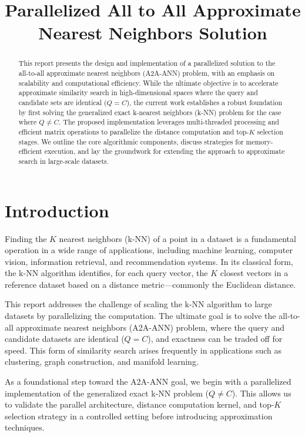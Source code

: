 \documentclass[conference]{IEEEtran}
\title{Parallelized All to All Approximate Nearest Neighbors Solution}
\author{\IEEEauthorblockN{Rousomanis Georgios}
\IEEEauthorblockA{Department of Electrical and Computer Engineering\\
Aristotle University of Thessaloniki\\
Email: rousoman@ece.auth.gr}
}
\begin{document}
\maketitle

\begin{abstract}
This report presents the design and implementation of a parallelized solution to the all-to-all 
approximate nearest neighbors (A2A-ANN) problem, with an emphasis on scalability and computational 
efficiency. While the ultimate objective is to accelerate approximate similarity search in 
high-dimensional spaces where the query and candidate sets are identical ($Q = C$), the current 
work establishes a robust foundation by first solving the generalized exact k-nearest neighbors 
(k-NN) problem for the case where $Q \neq C$. The proposed implementation leverages multi-threaded 
processing and efficient matrix operations to parallelize the distance computation and top-$K$ 
selection stages. We outline the core algorithmic components, discuss strategies for memory-efficient 
execution, and lay the groundwork for extending the approach to approximate search in large-scale datasets.

\end{abstract}

\section{Introduction}
Finding the $K$ nearest neighbors (k-NN) of a point in a dataset is a fundamental operation in a wide 
range of applications, including machine learning, computer vision, information retrieval, and recommendation
systems. In its classical form, the k-NN algorithm identifies, for each query vector, the $K$ closest vectors 
in a reference dataset based on a distance metric—commonly the Euclidean distance.

This report addresses the challenge of scaling the k-NN algorithm to large datasets by parallelizing the 
computation. The ultimate goal is to solve the all-to-all approximate nearest neighbors (A2A-ANN) problem, 
where the query and candidate datasets are identical ($Q = C$), and exactness can be traded off for speed. 
This form of similarity search arises frequently in applications such as clustering, graph construction, 
and manifold learning.

As a foundational step toward the A2A-ANN goal, we begin with a parallelized implementation of the 
generalized exact k-NN problem ($Q \neq C$). This allows us to validate the parallel architecture, distance
computation kernel, and top-$K$ selection strategy in a controlled setting before introducing approximation 
techniques.
\end{document}
